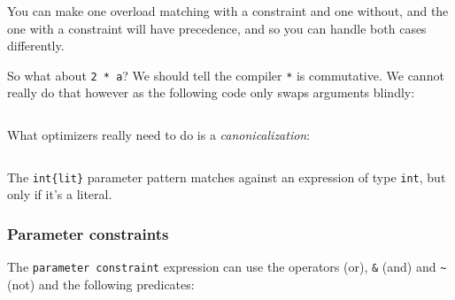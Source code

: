 You can make one overload matching with a constraint and one without,
and the one with a constraint will have precedence, and so you can
handle both cases differently.

So what about \texttt{2\ *\ a}? We should tell the compiler \texttt{*}
is commutative. We cannot really do that however as the following code
only swaps arguments blindly:

\begin{verbatim}
\end{verbatim}

What optimizers really need to do is a \emph{canonicalization}:

\begin{verbatim}
\end{verbatim}

The \texttt{int\{lit\}} parameter pattern matches against an expression
of type \texttt{int}, but only if it's a literal.

\hypertarget{parameter-constraints}{%
\subsubsection{Parameter constraints}\label{parameter-constraints}}

The \texttt{parameter\ constraint} expression can use the operators
\texttt{\textbar{}} (or), \texttt{\&} (and) and
\texttt{\textasciitilde{}} (not) and the following predicates:

